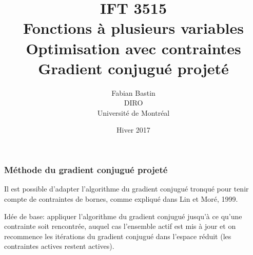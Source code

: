 \documentclass[t,usepdftitle=false]{beamer}
\title[IFT3515]{IFT 3515\\Fonctions à plusieurs variables\\Optimisation avec contraintes\\Gradient conjugué projeté}
\author[Fabian Bastin]{Fabian Bastin\\DIRO\\Université de Montréal}
\date{Hiver 2017}
\begin{document}
\frame{\titlepage}


\begin{frame}
\frametitle{Méthode du gradient conjugué projeté}

Il est possible d'adapter l'algorithme du gradient conjugué tronqué pour tenir compte de contraintes de bornes, comme expliqué dans Lin et Moré, 1999.

\mbox{}

Idée de base: appliquer l'algorithme du gradient conjugué jusqu'à ce qu'une contrainte soit rencontrée, auquel cas l'ensemble actif est mis à jour et on recommence les itérations du gradient conjugué dans l'espace réduit (les contraintes actives restent actives).

\end{frame}
\end{document}
